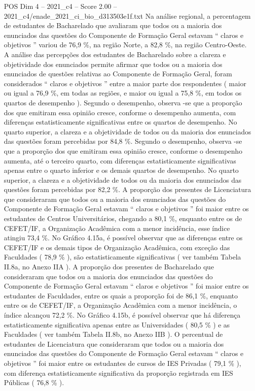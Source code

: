 \begin{textsample}{POS Dim 4 – 2021\_c4 – Score 2.00 – 2021\_c4/enade\_2021\_ci\_bio\_d313503e1f.txt}
Na análise regional, a percentagem de estudantes de Bacharelado que avaliaram que todos ou a maioria dos enunciados das questões do Componente de Formação Geral estavam “ claros e objetivos ” variou de 76,9 \%, na região Norte, a 82,8 \%, na região Centro-Oeste.
A análise das percepções dos estudantes de Bacharelado sobre a clareza e objetividade dos enunciados permite afirmar que todos ou a maioria dos enunciados de questões relativas ao Componente de Formação Geral, foram considerados “ claros e objetivos ” entre a maior parte dos respondentes ( maior ou igual a 76,9 \%, em todas as regiões, e maior ou igual a 75,8 \%, em todos os quartos de desempenho ).
Segundo o desempenho, observa -se que a proporção dos que emitiram essa opinião cresce, conforme o desempenho aumenta, com diferenças estatisticamente significativas entre os quartos de desempenho.
No quarto superior, a clareza e a objetividade de todos ou da maioria dos enunciados das questões foram percebidas por 84,8 \%.
Segundo o desempenho, observa -se que a proporção dos que emitiram essa opinião cresce, conforme o desempenho aumenta, até o terceiro quarto, com diferenças estatisticamente significativas apenas entre o quarto inferior e os demais quartos de desempenho.
No quarto superior, a clareza e a objetividade de todos ou da maioria dos enunciados das questões foram percebidas por 82,2 \%.
A proporção dos presentes de Licenciatura que consideraram que todos ou a maioria dos enunciados das questões do Componente de Formação Geral estavam “ claros e objetivos ” foi maior entre os estudantes de Centros Universitários, chegando a 80,1 \%, enquanto entre os de CEFET/IF, a Organização Acadêmica com a menor incidência, esse índice atingiu 73,4 \%.
No Gráfico 4.15a, é possível observar que as diferenças entre os CEFET/IF e os demais tipos de Organização Acadêmica, com exceção das Faculdades ( 78,9 \% ), são estatisticamente significativas ( ver também Tabela II.8a, no Anexo IIA ).
A proporção dos presentes de Bacharelado que consideraram que todos ou a maioria dos enunciados das questões do Componente de Formação Geral estavam “ claros e objetivos ” foi maior entre os estudantes de Faculdades, entre os quais a proporção foi de 86,1 \%, enquanto entre os de CEFET/IF, a Organização Acadêmica com a menor incidência, o índice alcançou 72,2 \%.
No Gráfico 4.15b, é possível observar que há diferença estatisticamente significativa apenas entre as Universidades ( 80,5 \% ) e as Faculdades ( ver também Tabela II.8b, no Anexo IIB ).
O percentual de estudantes de Licenciatura que consideraram que todos ou a maioria dos enunciados das questões do Componente de Formação Geral estavam “ claros e objetivos ” foi maior entre os estudantes de cursos de IES Privadas ( 79,1 \% ), com diferença estatisticamente significativa da proporção registrada em IES Públicas ( 76,8 \% ).

\end{textsample}
